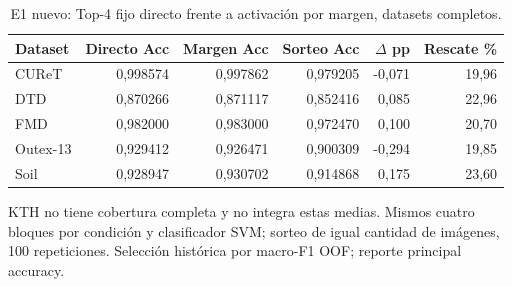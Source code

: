 \begin{table}[!htbp]\centering
\fontsize{8}{10}\selectfont\setlength{\tabcolsep}{4pt}
\caption{E1 nuevo: Top-4 fijo directo frente a activación por margen, datasets completos.}\label{tab:e1-fixed4-accuracy}
\begin{tabular}{@{}lrrrrr@{}}\toprule
Dataset & Directo Acc & Margen Acc & Sorteo Acc & $\Delta$ pp & Rescate \%\\\midrule
CUReT & 0,998574 & 0,997862 & 0,979205 & -0,071 & 19,96\\
DTD & 0,870266 & 0,871117 & 0,852416 & 0,085 & 22,96\\
FMD & 0,982000 & 0,983000 & 0,972470 & 0,100 & 20,70\\
Outex-13 & 0,929412 & 0,926471 & 0,900309 & -0,294 & 19,85\\
Soil & 0,928947 & 0,930702 & 0,914868 & 0,175 & 23,60\\
\bottomrule\end{tabular}
\par\smallskip\begin{minipage}{0.98\textwidth}\footnotesize KTH no tiene cobertura completa y no integra estas medias. Mismos cuatro bloques por condición y clasificador SVM; sorteo de igual cantidad de imágenes, 100 repeticiones. Selección histórica por macro-F1 OOF; reporte principal accuracy.\end{minipage}
\end{table}
